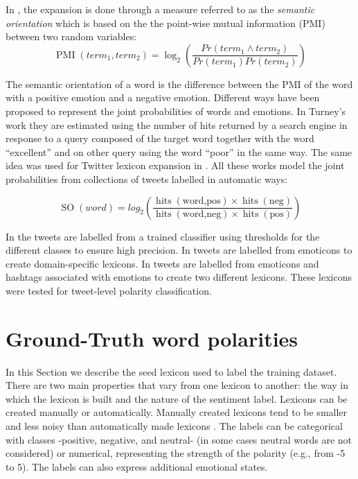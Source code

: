 \documentclass{sig-alternate}
\begin{document}
In \cite{Turney2002, turney2003measuring}, the expansion is done through a measure referred to as the \emph{semantic orientation} which is based on the the point-wise mutual information (PMI) between two random variables:
\begin{equation}
 \operatorname{PMI}(term_{1}, term_{2})= \log_{2} \left ( \frac{Pr(term_{1} \wedge term_{2})}{Pr(term_{1})Pr(term_{2})} \right )
\end{equation}

The semantic orientation of a word is the difference between the PMI of the word with a positive emotion and a negative emotion. Different ways have been proposed to represent the joint probabilities of words and emotions. In Turney's work they are estimated using the number of hits returned by a search engine in response to a query composed of the target word together with the word ``excellent'' and on other query using the word ``poor'' in the same way.  
The same idea was used for Twitter lexicon expansion in 
\cite{Mohammad2013, avaya2013, Zhou2014}. All these works model the joint probabilities from collections of tweets labelled in automatic ways:

\begin{equation}
 \operatorname{SO}(word) = log_2 \left( \frac{\operatorname{hits}(\text{word,pos}) \times \operatorname{hits}(\text{neg})}{\operatorname{hits}(\text{word,neg}) \times \operatorname{hits}(\text{pos})}\right)
\end{equation}

In \cite{avaya2013} the tweets are labelled from a trained classifier using thresholds for the different classes to ensure high precision. In \cite{Zhou2014}  tweets are labelled from emoticons to create domain-specific lexicons. In \cite{Mohammad2013} tweets are labelled from emoticons and hashtags associated with emotions to create two different lexicons. These lexicons were tested for tweet-level polarity classification. 




\section{Ground-Truth word polarities}\label{sec:seed_lex}
In this Section we describe the seed lexicon used to label the training dataset. There are two main properties that vary from one lexicon to another: the way in which the lexicon is built and the nature of the sentiment label. Lexicons can be created manually or automatically. Manually created lexicons tend to be smaller and less noisy than automatically made lexicons \cite{BravoMarquez2014}.  The labels can be categorical with classes -positive, negative, and neutral- (in some cases neutral words are not considered) or numerical, representing the strength of the polarity (e.g., from -5 to 5). The labels can also express additional emotional states.
\end{document}
